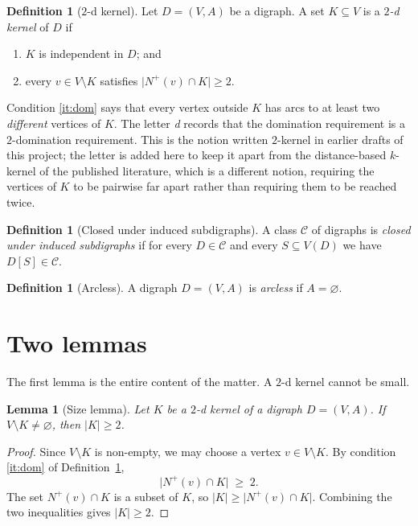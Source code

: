 \documentclass[11pt]{article}
\theoremstyle{plain}
\newtheorem{lemma}[theorem]{Lemma}
\theoremstyle{definition}
\newtheorem{definition}[theorem]{Definition}
\theoremstyle{remark}
\newcommand{\Nout}{N^{+}}
\begin{document}
\begin{definition}[$2$-d kernel]\label{def:2dk}
Let $D = (V,A)$ be a digraph. A set $K \subseteq V$ is a \emph{$2$-d kernel} of $D$ if
\begin{enumerate}[label=(\roman*)]
  \item\label{it:indep} $K$ is independent in $D$; and
  \item\label{it:dom} every $v \in V \setminus K$ satisfies
        $\lvert \Nout(v) \cap K \rvert \geq 2$.
\end{enumerate}
\end{definition}

Condition \ref{it:dom} says that every vertex outside $K$ has arcs to at least two
\emph{different} vertices of $K$. The letter \emph{d} records that the domination
requirement is a $2$-domination requirement. This is the notion written $2$-kernel in earlier
drafts of this project; the letter is added here to keep it apart from the distance-based
$k$-kernel of the published literature, which is a different notion, requiring the vertices
of $K$ to be pairwise far apart rather than requiring them to be reached twice.

\begin{definition}[Closed under induced subdigraphs]\label{def:hered}
A class $\mathcal{C}$ of digraphs is \emph{closed under induced subdigraphs} if for every
$D \in \mathcal{C}$ and every $S \subseteq V(D)$ we have $D[S] \in \mathcal{C}$.
\end{definition}

\begin{definition}[Arcless]
A digraph $D = (V,A)$ is \emph{arcless} if $A = \varnothing$.
\end{definition}

\section{Two lemmas}

The first lemma is the entire content of the matter. A $2$-d kernel cannot be small.

\begin{lemma}[Size lemma]\label{lem:size}
Let $K$ be a $2$-d kernel of a digraph $D = (V,A)$. If $V \setminus K \neq \varnothing$,
then $\lvert K \rvert \geq 2$.
\end{lemma}

\begin{proof}
Since $V \setminus K$ is non-empty, we may choose a vertex $v \in V \setminus K$. By
condition \ref{it:dom} of Definition~\ref{def:2dk},
\[
  \lvert \Nout(v) \cap K \rvert \;\geq\; 2 .
\]
The set $\Nout(v) \cap K$ is a subset of $K$, so $\lvert K \rvert \geq \lvert \Nout(v) \cap K \rvert$.
Combining the two inequalities gives $\lvert K \rvert \geq 2$.
\end{proof}
\end{document}
